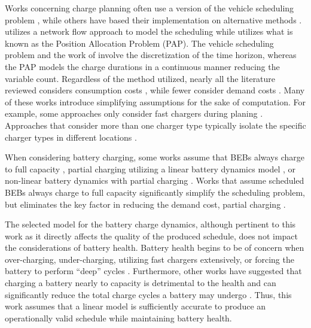 \documentclass[energies,article,submit,moreauthors]{Definitions/mdpi}
\begin{document}
Works concerning charge planning often use a version of the vehicle scheduling problem \cite{zhang-2021-optim-elect,duan-2021-refor-mixed,rinaldi-2020-mixed-fleet,tang-2019-robus-sched,li-2014-trans-bus,he-2020-optim-charg},
while others have based their implementation on alternative methods
\cite{qarebagh-2019-optim-sched,whitaker-2023-a-network}. \cite{whitaker-2023-a-network} utilizes a network flow
approach to model the scheduling while \cite{qarebagh-2019-optim-sched} utilizes what is known as the Position
Allocation Problem (PAP). The vehicle scheduling problem and the work of \cite{whitaker-2023-a-network} involve the
discretization of the time horizon, whereas the PAP models the charge durations in a continuous manner reducing the
variable count. Regardless of the method utilized, nearly all the literature reviewed considers consumption costs
\cite{jahic-2019-preem,frendo-2021-open-sourc,qin-2016-numer-analy,zhou-2020-bi-objec,duan-2021-refor-mixed,mortensen-2023-cost-minim,zhou-2020-collab-optim,rinaldi-2020-mixed-fleet,zhou-2020-collab-optim}, while fewer
consider demand costs \cite{jahic-2019-preem,frendo-2021-open-sourc,qin-2016-numer-analy,mortensen-2023-cost-minim,he-2020-optim-charg}. Many of these works introduce simplifying assumptions for the sake of
computation. For example, some approaches only consider fast chargers during planing \cite{zhou-2020-collab-optim,li-2014-trans-bus,wang-2017-optim-rechar,sebastiani-2016-evaluat-elect,wei-2018-optim-spatio}. Approaches that
consider more than one charger type typically isolate the specific charger types in different locations
\cite{tang-2019-robus-sched,he-2020-optim-charg}.

When considering battery charging, some works assume that BEBs always charge to full capacity
\cite{duan-2021-refor-mixed,zhang-2021-optim-elect,zhou-2020-bi-objec,wang-2017-elect-vehic}, partial charging
utilizing a linear battery dynamics model \cite{wei-2018-optim-spatio,he-2020-optim-charg,mortensen-2023-cost-minim}, or non-linear battery dynamics with partial charging \cite{whitaker-2023-a-network,zhang-2021-optim-elect,qin-2016-numer-analy,jahic-2019-preem,frendo-2021-open-sourc}. Works that assume scheduled
BEBs always charge to full capacity significantly simplify the scheduling problem, but eliminates the key factor in
reducing the demand cost, partial charging \cite{tang-2019-robus-sched,duan-2021-refor-mixed,rinaldi-2020-mixed-fleet,zhou-2020-collab-optim}.

The selected model for the battery charge dynamics, although pertinent to this work as it directly affects the quality
of the produced schedule, does not impact the considerations of battery health. Battery health begins to be of concern
when over-charging, under-charging, utilizing fast chargers extensively, or forcing the battery to perform ``deep'' cycles
\cite{zhou-2020-bi-objec,millner-2010-model-lithium,edge-2021-lithium}. Furthermore, other works have suggested
that charging a battery nearly to capacity is detrimental to the health and can significantly reduce the total charge
cycles a battery may undergo \cite{edge-2021-lithium,millner-2010-model-lithium}. Thus, this work assumes that a
linear model is sufficiently accurate to produce an operationally valid schedule while maintaining battery health.
\end{document}
